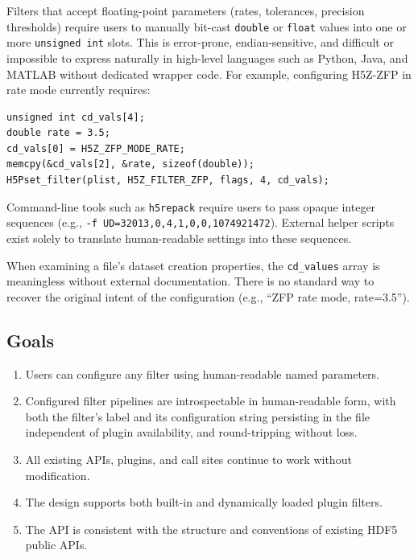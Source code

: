 \documentclass[../RFC-HDFG-2026-001.tex]{subfiles}
\begin{document}
Filters that accept floating-point parameters (rates,
tolerances, precision thresholds) require users to manually bit-cast \texttt{double}
or \texttt{float} values into one or more \texttt{unsigned int} slots. This is error-prone,
endian-sensitive, and difficult or impossible to express naturally in
high-level languages such as Python, Java, and MATLAB without dedicated
wrapper code. For example, configuring H5Z-ZFP in rate mode currently
requires:

\begin{verbatim}
unsigned int cd_vals[4];
double rate = 3.5;
cd_vals[0] = H5Z_ZFP_MODE_RATE;
memcpy(&cd_vals[2], &rate, sizeof(double));
H5Pset_filter(plist, H5Z_FILTER_ZFP, flags, 4, cd_vals);
\end{verbatim}

Command-line tools such as \texttt{h5repack} require users to pass
opaque integer sequences (e.g., \texttt{-f UD=32013,\allowbreak{}0,\allowbreak{}4,\allowbreak{}1,\allowbreak{}0,\allowbreak{}0,\allowbreak{}1074921472}). External
helper scripts exist solely to translate human-readable settings into these
sequences.

When examining a file's dataset creation properties,
the \texttt{cd\_values} array is meaningless without external documentation. There is
no standard way to recover the original intent of the configuration (e.g.,
``ZFP rate mode, rate=3.5'').

\subsection{Goals}

\begin{enumerate}
\item Users can configure any filter using human-readable named
   parameters.
\item Configured filter pipelines are introspectable in human-readable form,
   with both the filter's label and its configuration string persisting in
   the file independent of plugin availability, and round-tripping without
   loss.
\item All existing APIs, plugins, and call sites continue to work without
   modification.
\item The design supports both built-in and dynamically loaded plugin
   filters.
\item The API is consistent with the structure and conventions of existing
   HDF5 public APIs.
\end{enumerate}
\end{document}
